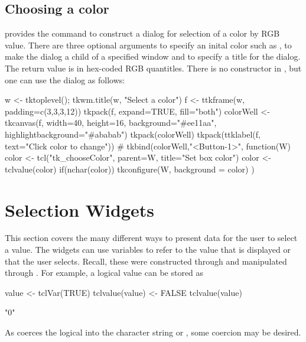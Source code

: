 \subsection{Choosing a color}
\Tk\/ provides the command  to construct a dialog for selection of a color by RGB value. There are three optional arguments  to specify an inital color such as ,  to make the dialog a child of a specified window and  to specify a title for the dialog. The return value is in hex-coded RGB quantitles. 
There is no constructor in , but one can use the dialog as follows:
\begin{Schunk}
\begin{Sinput}
 w <- tktoplevel(); tkwm.title(w, "Select a color")
 f <- ttkframe(w, padding=c(3,3,3,12))
 tkpack(f, expand=TRUE, fill="both")
 colorWell <- tkcanvas(f, width=40, height=16, 
                       background="#ee11aa",
                       highlightbackground="#ababab") 
 tkpack(colorWell)
 tkpack(ttklabel(f, text="Click color to change"))
 #
 tkbind(colorWell,"<Button-1>", function(W) {
   color <- tcl("tk_chooseColor", parent=W, title="Set box color")
   color <- tclvalue(color)
   if(nchar(color))
     tkconfigure(W, background = color)
 })
\end{Sinput}
\end{Schunk}



\section{Selection Widgets}
\label{sec:tcltk:selection-widgets}

This section covers the many different ways to present data for the
user to select a value. The widgets can use \TCL\/ variables to refer
to the value that is displayed or that the user selects.  Recall,
these were constructed through  and manipulated
through .  For example, a logical value can be stored as
\begin{Schunk}
\begin{Sinput}
 value <- tclVar(TRUE)
 tclvalue(value) <- FALSE
 tclvalue(value)
\end{Sinput}
\begin{Soutput}
[1] "0"
\end{Soutput}
\end{Schunk}
As  coerces the logical into the  character string   or , some coercion may be desired.

